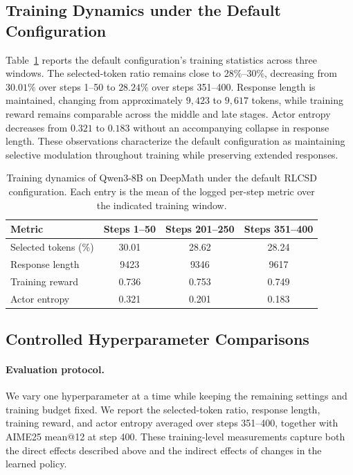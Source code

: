 \subsection{Training Dynamics under the Default Configuration}

Table~\ref{tab:default-dynamics} reports the default configuration's training statistics across three windows. The selected-token ratio remains close to $28\%$--$30\%$, decreasing from $30.01\%$ over steps 1--50 to $28.24\%$ over steps 351--400. Response length is maintained, changing from approximately $9{,}423$ to $9{,}617$ tokens, while training reward remains comparable across the middle and late stages. Actor entropy decreases from $0.321$ to $0.183$ without an accompanying collapse in response length. These observations characterize the default configuration as maintaining selective modulation throughout training while preserving extended responses.

\begin{table}[t]
\centering
\caption{Training dynamics of Qwen3-8B on DeepMath under the default RLCSD configuration. Each entry is the mean of the logged per-step metric over the indicated training window.}
\label{tab:default-dynamics}
\small
\setlength{\tabcolsep}{10pt}
\begin{tabular}{lccc}
\toprule
Metric & Steps 1--50 & Steps 201--250 & Steps 351--400 \\
\midrule
Selected tokens (\%) & 30.01 & 28.62 & 28.24 \\
Response length     & 9423  & 9346  & 9617  \\
Training reward     & 0.736 & 0.753 & 0.749 \\
Actor entropy       & 0.321 & 0.201 & 0.183 \\
\bottomrule
\end{tabular}
\end{table}

\subsection{Controlled Hyperparameter Comparisons}

\paragraph{Evaluation protocol.}
We vary one hyperparameter at a time while keeping the remaining settings and training budget fixed. We report the selected-token ratio, response length, training reward, and actor entropy averaged over steps 351--400, together with AIME25 mean@12 at step 400. These training-level measurements capture both the direct effects described above and the indirect effects of changes in the learned policy.


